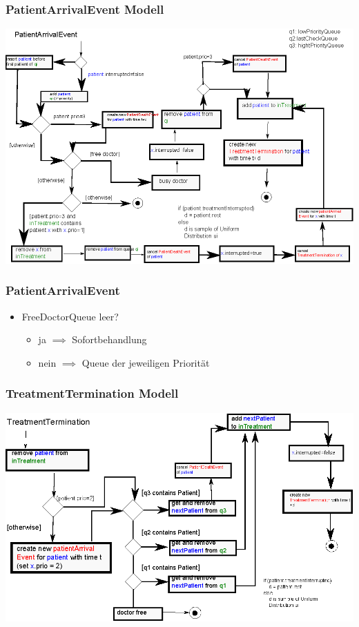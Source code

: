 \documentclass{beamer}
\begin{document}
\begin{frame}
	\frametitle{PatientArrivalEvent Modell}
	\includegraphics[scale=1]{img/PatientArrivalEvent.eps}
\end{frame}

\begin{frame}
	\frametitle{PatientArrivalEvent}
	\begin{itemize}
		\item FreeDoctorQueue leer? 
		\begin{itemize}
			\item ja $\implies$ Sofortbehandlung
			\item nein $\implies$ Queue der jeweiligen Priorit\"{a}t
		\end{itemize}
	\end{itemize}
\end{frame}

\begin{frame}
	\frametitle{TreatmentTermination Modell}
	\includegraphics[scale=1]{img/TreatmentTermination.eps}
\end{frame}
\end{document}
